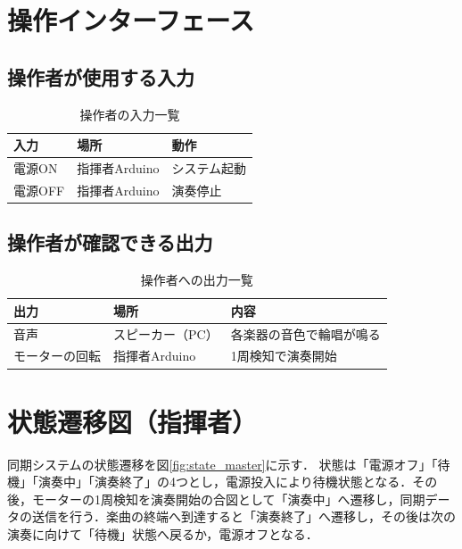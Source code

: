 \documentclass[uplatex,dvipdfmx,report]{jlreq}
\begin{document}
\section{操作インターフェース}

\subsection{操作者が使用する入力}

\begin{table}[H]
  \centering
  \caption{操作者の入力一覧}
  \begin{tabular}{l l l}
    \toprule
    入力 & 場所 & 動作 \\
    \midrule
    電源ON & 指揮者Arduino & システム起動 \\
    電源OFF & 指揮者Arduino & 演奏停止 \\
    \bottomrule
  \end{tabular}
\end{table}

\subsection{操作者が確認できる出力}

\begin{table}[H]
  \centering
  \caption{操作者への出力一覧}
  \begin{tabular}{l l l}
    \toprule
    出力 & 場所 & 内容 \\
    \midrule
    音声 & スピーカー（PC） & 各楽器の音色で輪唱が鳴る \\
    モーターの回転 & 指揮者Arduino & 1周検知で演奏開始 \\
    \bottomrule
  \end{tabular}
\end{table}





\section{状態遷移図（指揮者）}
同期システムの状態遷移を図\ref{fig:state_master}に示す．
状態は「電源オフ」「待機」「演奏中」「演奏終了」の4つとし，電源投入により待機状態となる．その後，モーターの1周検知を演奏開始の合図として「演奏中」へ遷移し，同期データの送信を行う．楽曲の終端へ到達すると「演奏終了」へ遷移し，その後は次の演奏に向けて「待機」状態へ戻るか，電源オフとなる．
\end{document}
